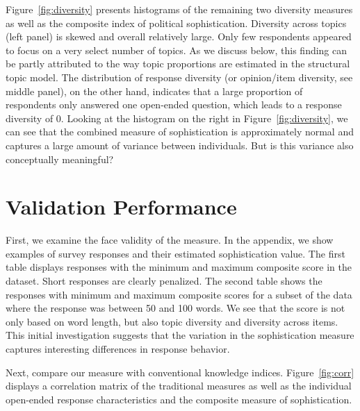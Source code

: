 \documentclass[12pt]{article}
\begin{document}
Figure~\ref{fig:diversity} presents histograms of the remaining two diversity measures as well as the composite index of political sophistication. Diversity across topics (left panel) is skewed and overall relatively large. Only few respondents appeared to focus on a very select number of topics. As we discuss below, this finding can be partly attributed to the way topic proportions are estimated in the structural topic model. The distribution of response diversity (or opinion/item diversity, see middle panel), on the other hand, indicates that a large proportion of respondents only answered one open-ended question, which leads to a response diversity of 0. Looking at the histogram on the right in Figure~\ref{fig:diversity}, we can see that the combined measure of sophistication is approximately normal and captures a large amount of variance between individuals. But is this variance also conceptually meaningful?


\section{Validation Performance}

First, we examine the face validity of the measure. In the appendix, we show examples of survey responses and their estimated sophistication value. The first table displays responses with the minimum and maximum composite score in the dataset.  Short responses are clearly penalized. The second table shows the responses with minimum and maximum composite scores for a subset of the data where the response was between 50 and 100 words. We see that the score is not only based on word length, but also topic diversity and diversity across items. This initial investigation suggests that the variation in the sophistication measure captures interesting differences in response behavior.

Next, compare our measure with conventional knowledge indices. Figure~\ref{fig:corr} displays a correlation matrix of the traditional measures as well as the individual open-ended response characteristics and the composite measure of sophistication.
\end{document}
